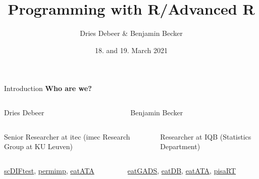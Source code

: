 \documentclass{beamer}\usepackage[]{graphicx}\usepackage[]{color}
\begin{document}

\title{Programming with R/Advanced R}


\author[Dries Debeer \& Benjamin Becker]{Dries Debeer \& Benjamin Becker}
\date{18. and 19. March 2021}


\begin{frame}
\titlepage
\end{frame}
\addtocounter{framenumber}{-1}

\begin{frame}{Introduction}
\textbf{Who are we?}

\begin{columns}[t]
\begin{column}{.475\textwidth}
\textcolor{mLightBrown}{Dries Debeer}
\end{column}
  \begin{column}{.475\textwidth}
    \textcolor{mLightBrown}{Benjamin Becker}
  \end{column}
\end{columns}

\begin{columns}[t]
\begin{column}{.475\textwidth}
Senior Researcher at itec (imec Research Group at KU Leuven)
  	
\end{column}
\begin{column}{.475\textwidth}
Researcher at IQB (Statistics Department)

  \end{column}
\end{columns}

\vspace{0.5cm}

\begin{columns}[t]
\begin{column}{.475\textwidth}
\href{https://github.com/ddebeer/scDIFtest}{scDIFtest}, \href{https://github.com/ddebeer/permimp}{permimp}, \href{https://github.com/beckerbenj/eatATA}{eatATA}
  	
\end{column}
\begin{column}{.475\textwidth}
\href{https://github.com/beckerbenj/eatGADS}{eatGADS}, \href{https://github.com/beckerbenj/eatDB}{eatDB}, \href{https://github.com/beckerbenj/eatATA}{eatATA}, \href{https://github.com/beckerbenj/pisaRT}{pisaRT}

  \end{column}
\end{columns}


\end{frame}
\end{document}
